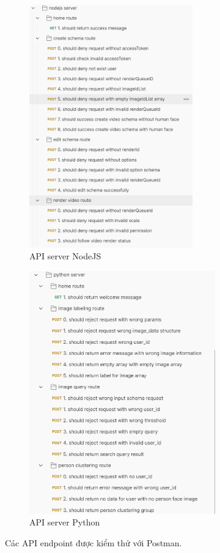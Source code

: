 \begin{figure}[H]
    \centering
    \begin{subfigure}{0.49\textwidth}
        \centering
        \includegraphics[height=10.5cm]{figures/c4/4-3/api_node.png} 
        \caption{API server NodeJS}
    \end{subfigure}
    \hfill
    \begin{subfigure}{0.49\textwidth}
        \centering
        \includegraphics[height=10.5cm]{figures/c4/4-3/api_python.png} 
        \caption{API server Python}
    \end{subfigure}
    \caption{Các API endpoint được kiểm thử với Postman.}
    \label{fig:postman}
\end{figure}

